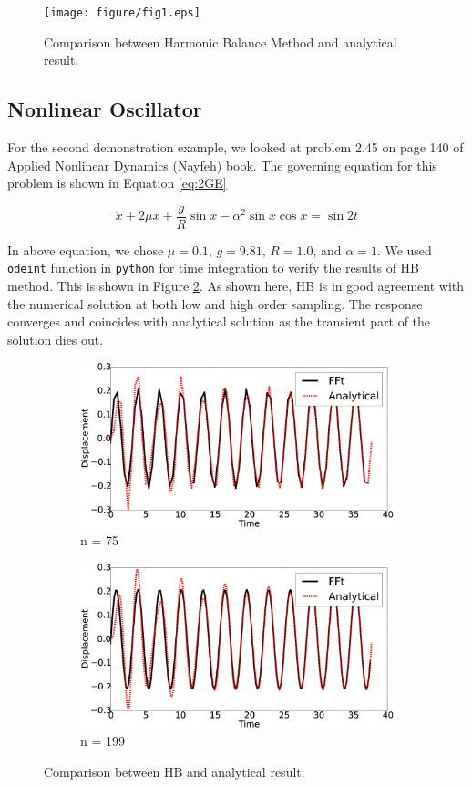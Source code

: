 \documentclass[12pt, a4paper]{extarticle}
\begin{document}
\begin{figure}[H]
	\centering
	\texttt{[image: figure/fig1.eps]}
    \caption{Comparison between Harmonic Balance Method and analytical result.}
    \label{fig:samR1}
\end{figure}
\subsection{Nonlinear Oscillator}
For the second demonstration example, we looked at problem 2.45 on page 140 of Applied Nonlinear Dynamics (Nayfeh) book. The governing equation for this problem is shown in Equation \eqref{eq:2GE}

\begin{equation}\label{eq:2GE}
	\ddot{x} + 2 \mu \dot{x} + \frac{g}{R} \sin x - \alpha^2 \sin x \cos x = \sin 2t
\end{equation}

In above equation, we chose $\mu = 0.1$, $g = 9.81$, $R = 1.0$, and $\alpha = 1$. We used \texttt{odeint} function in \texttt{python} for time integration to verify the results of HB method. This is shown in Figure \ref{fig:R2}. As shown here, HB is in good agreement with the numerical solution at both low and high order sampling. The response converges and coincides with analytical solution as the transient part of the solution dies out.

\begin{figure}[H]
	\centering
	\begin{subfigure}[h]{8.0 cm}
		\includegraphics[width=8.0 cm]{figure/2N75.eps}
		\caption{n = 75}
	\end{subfigure}
	\begin{subfigure}[h]{8.0 cm}
        \includegraphics[width=8.0 cm]{figure/2N199.eps}
		\caption{n = 199}
    \end{subfigure}
    \caption{Comparison between HB and analytical result.}
    \label{fig:R2}
\end{figure}
\end{document}
